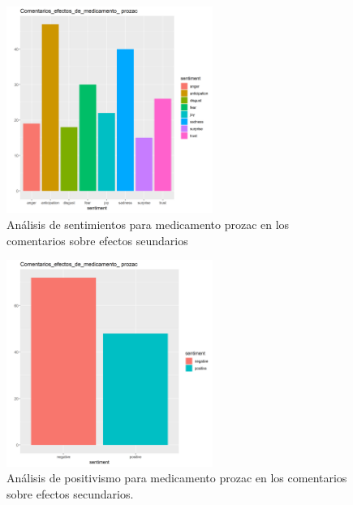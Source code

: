 \documentclass[spanish,]{article}
\begin{document}
\begin{figure}[h]
    \centering
    \includegraphics[width=0.6\textwidth]{figuras/sentimientos/Bprozac1.png}
    \caption{Análisis de sentimientos para medicamento prozac en los comentarios sobre efectos seundarios}
    \label{fig:sentimientos:38}
\end{figure}

\begin{figure}[h]
    \centering
    \includegraphics[width=0.6\textwidth]{figuras/sentimientos/Bprozac2.png}
    \caption{Análisis de positivismo para medicamento prozac en los comentarios sobre efectos secundarios.}
    \label{fig:sentimientos:39}
\end{figure}
\end{document}
